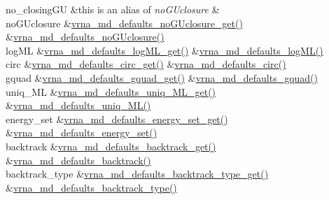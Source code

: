 \begin{DoxyRefList}
\begin{longtabu}
no\+\_\+closing\+GU  &this is an alias of {\itshape no\+G\+Uclosure}  &\\
no\+G\+Uclosure  &\mbox{\hyperlink{group__model__details_ga4f7fdad083243a5348d63320ddaa70f3}{vrna\+\_\+md\+\_\+defaults\+\_\+no\+G\+Uclosure\+\_\+get()}}  &\mbox{\hyperlink{group__model__details_gade5b9951d71ca2fb357a4e6c0c18ccd1}{vrna\+\_\+md\+\_\+defaults\+\_\+no\+G\+Uclosure()}}   \\
log\+ML  &\mbox{\hyperlink{group__model__details_ga93f04e070d529c5d0bb87c9681f6ad29}{vrna\+\_\+md\+\_\+defaults\+\_\+log\+M\+L\+\_\+get()}}  &\mbox{\hyperlink{group__model__details_ga3de50a73455d88c3957386933b8e1f90}{vrna\+\_\+md\+\_\+defaults\+\_\+log\+M\+L()}}   \\
circ  &\mbox{\hyperlink{group__model__details_gad3a7e58de344ad93a08925f58f94f6fb}{vrna\+\_\+md\+\_\+defaults\+\_\+circ\+\_\+get()}}  &\mbox{\hyperlink{group__model__details_ga4e1deb3e91a8a99e5c6dd905a5eb0186}{vrna\+\_\+md\+\_\+defaults\+\_\+circ()}}   \\
gquad  &\mbox{\hyperlink{group__model__details_gae645b8612f879eb38b45244fa9eddb9e}{vrna\+\_\+md\+\_\+defaults\+\_\+gquad\+\_\+get()}}  &\mbox{\hyperlink{group__model__details_ga0685ca2aeb39af76f2421fc308163dce}{vrna\+\_\+md\+\_\+defaults\+\_\+gquad()}}   \\
uniq\+\_\+\+ML  &\mbox{\hyperlink{group__model__details_gab48e70fd024bf838404bcbcca0c874a0}{vrna\+\_\+md\+\_\+defaults\+\_\+uniq\+\_\+\+M\+L\+\_\+get()}}  &\mbox{\hyperlink{group__model__details_ga59b944f61c5d2babec2d4c48c820de67}{vrna\+\_\+md\+\_\+defaults\+\_\+uniq\+\_\+\+M\+L()}}   \\
energy\+\_\+set  &\mbox{\hyperlink{group__model__details_ga017ed6afb1cba2b7f242412cab618b53}{vrna\+\_\+md\+\_\+defaults\+\_\+energy\+\_\+set\+\_\+get()}}  &\mbox{\hyperlink{group__model__details_ga8dd29c55787a4576277e1907e92d810c}{vrna\+\_\+md\+\_\+defaults\+\_\+energy\+\_\+set()}}   \\
backtrack  &\mbox{\hyperlink{group__model__details_ga90da1156e6883ddd68527c2830706648}{vrna\+\_\+md\+\_\+defaults\+\_\+backtrack\+\_\+get()}}  &\mbox{\hyperlink{group__model__details_ga978c468b2fe96a70d5191e3dd17d5599}{vrna\+\_\+md\+\_\+defaults\+\_\+backtrack()}}   \\
backtrack\+\_\+type  &\mbox{\hyperlink{group__model__details_ga1425b4ebd0e034dead66d79becd64143}{vrna\+\_\+md\+\_\+defaults\+\_\+backtrack\+\_\+type\+\_\+get()}}  &\mbox{\hyperlink{group__model__details_ga68305274de96b56b7799575e222560d8}{vrna\+\_\+md\+\_\+defaults\+\_\+backtrack\+\_\+type()}}   \\

\end{longtabu}
\end{DoxyRefList}
